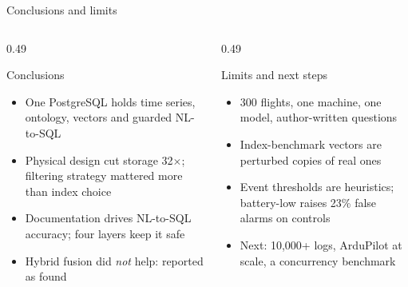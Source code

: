 \documentclass[aspectratio=169,10pt]{beamer}
\begin{document}
\begin{frame}[shrink=5]{Conclusions and limits}
\begin{columns}[T]
\begin{column}{0.49\textwidth}
\begin{block}{Conclusions}
\begin{itemize}
  \item One PostgreSQL holds time series, ontology, vectors and guarded NL-to-SQL
  \item Physical design cut storage 32$\times$; filtering strategy mattered more than index choice
  \item Documentation drives NL-to-SQL accuracy; four layers keep it safe
  \item Hybrid fusion did \emph{not} help: reported as found
\end{itemize}
\end{block}
\end{column}
\begin{column}{0.49\textwidth}
\begin{block}{Limits and next steps}
\begin{itemize}
  \item 300 flights, one machine, one model, author-written questions
  \item Index-benchmark vectors are perturbed copies of real ones
  \item Event thresholds are heuristics; battery-low raises 23\% false alarms on controls
  \item Next: 10,000+ logs, ArduPilot at scale, a concurrency benchmark
\end{itemize}
\end{block}
\end{column}
\end{columns}
\end{frame}
\end{document}
